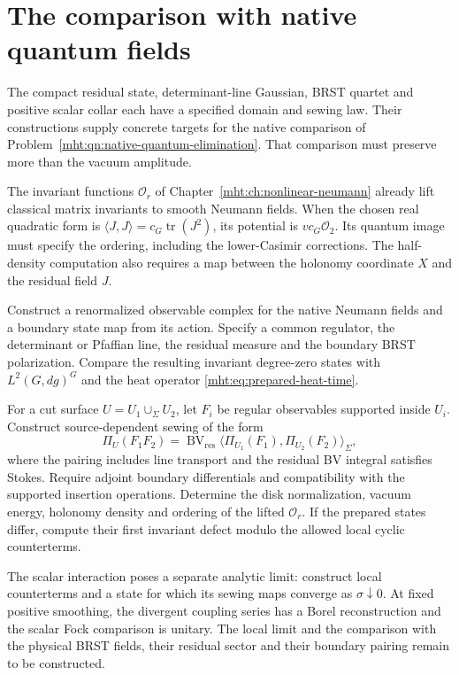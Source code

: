 \section{The comparison with native quantum fields}

The compact residual state, determinant-line Gaussian,
BRST quartet and positive scalar collar each have a specified
domain and sewing law. Their constructions supply concrete
targets for the native comparison of
Problem~\ref{mht:qn:native-quantum-elimination}.
That comparison must preserve more than the vacuum amplitude.

The invariant functions $\mathcal O_r$ of
Chapter~\ref{mht:ch:nonlinear-neumann} already lift classical
matrix invariants to smooth Neumann fields.
When the chosen real quadratic form is
$\langle J,J\rangle=c_G\operatorname{tr}(J^2)$, its potential
is $vc_G\mathcal O_2$. Its quantum image must specify the
ordering, including the lower-Casimir corrections.
The half-density computation also requires a map between
the holonomy coordinate $X$ and the residual field $J$.

\begin{problem}\label{mht:qn:native-prepared-state}
Construct a renormalized observable complex for the native
Neumann fields and a boundary state map from its action.
Specify a common regulator, the determinant or Pfaffian line,
the residual measure and the boundary BRST polarization.
Compare the resulting invariant degree-zero states with
$L^2(G,dg)^G$ and the heat operator
\eqref{mht:eq:prepared-heat-time}.

For a cut surface $U=U_1\cup_\Sigma U_2$, let $F_i$ be
regular observables supported inside $U_i$.
Construct source-dependent sewing of the form
\[
 \Pi_U(F_1F_2)=\operatorname{BV}_{\mathrm{res}}
       \bigl\langle\Pi_{U_1}(F_1),\Pi_{U_2}(F_2)\bigr\rangle_\Sigma,
\]
where the pairing includes line transport and the residual
BV integral satisfies Stokes. Require adjoint boundary
differentials and compatibility with the supported insertion
operations. Determine the disk normalization, vacuum energy,
holonomy density and ordering of the lifted $\mathcal O_r$.
If the prepared states differ, compute their first invariant
defect modulo the allowed local cyclic counterterms.
\end{problem}

The scalar interaction poses a separate analytic limit:
construct local counterterms and a state for which its sewing
maps converge as $\sigma\downarrow0$.
At fixed positive smoothing, the divergent coupling series has
a Borel reconstruction and the scalar Fock comparison is unitary.
The local limit and the comparison with the physical BRST fields,
their residual sector and their boundary pairing remain to be
constructed.
